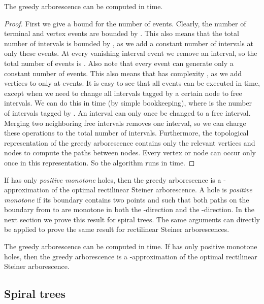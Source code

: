\documentclass{journalA4}
\begin{document}
\begin{lemma}
\label{lem:arbruntime} The greedy arborescence can be computed in  time.
\end{lemma}
\begin{proof}
First we give a bound for the number of events. Clearly, the number of terminal and vertex events are bounded by . This also means that the total number of intervals is
bounded by , as we add a constant number of intervals at only these events. At every vanishing interval event we remove an interval, so the total number of events is
. Also note that every event can generate only a constant number of events. This also means that  has complexity , as we add vertices to  only at events. It is
easy to see that all events can be executed in  time, except when we need to change all intervals tagged by a certain node  to free intervals. We can do this in
 time (by simple bookkeeping), where  is the number of intervals tagged by . An interval can only once be changed to a free interval. Merging two neighboring free
intervals removes one interval, so we can charge these operations to the total number of intervals. Furthermore, the topological representation of the greedy arborescence contains only the relevant vertices and nodes to compute the paths between nodes. Every vertex or node can occur only once in this representation. So the algorithm runs in  time.
\end{proof}

If  has only \emph{positive monotone} holes, then the greedy arborescence is a -approximation of the optimal rectilinear Steiner arborescence. A hole is
\emph{positive monotone} if its boundary contains two points  and  such that both paths on the boundary from  to  are monotone in both the -direction and the -direction. In the next section we prove this result for spiral trees. The same arguments can directly be applied to prove the same result for rectilinear Steiner arborescences.

\begin{theorem}
\label{lem:MSA}
The greedy arborescence can be computed in  time. If  has only positive monotone holes, then the greedy arborescence is a -approximation of the optimal rectilinear Steiner arborescence.
\end{theorem}

\subsection{Spiral trees} \label{sec:spirobstacles}
\end{document}
